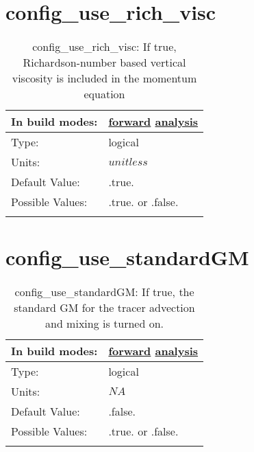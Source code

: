 \section[config\_use\_rich\_visc]{config\_use\_rich\_visc}
\label{sec:nm_sec_config_use_rich_visc}
\begin{center}
\begin{longtable}{| p{2.0in} || p{4.0in} |}
    \hline
    In build modes: & \hyperref[subsec:forward_nm_tab_vmix_rich]{forward} \hyperref[subsec:analysis_nm_tab_vmix_rich]{analysis} \\
    \hline
    Type: & logical \\
    \hline
    Units: & $unitless$ \\
    \hline
    Default Value: & .true. \\
    \hline
    Possible Values: & .true. or .false. \\
    \hline
    \caption{config\_use\_rich\_visc: If true, Richardson-number based vertical viscosity is included in the momentum equation}
\end{longtable}
\end{center}
\section[config\_use\_standardGM]{config\_use\_standardGM}
\label{sec:nm_sec_config_use_standardGM}
\begin{center}
\begin{longtable}{| p{2.0in} || p{4.0in} |}
    \hline
    In build modes: & \hyperref[subsec:forward_nm_tab_mesoscale_eddy_parameterization]{forward} \hyperref[subsec:analysis_nm_tab_mesoscale_eddy_parameterization]{analysis} \\
    \hline
    Type: & logical \\
    \hline
    Units: & $NA$ \\
    \hline
    Default Value: & .false. \\
    \hline
    Possible Values: & .true. or .false. \\
    \hline
    \caption{config\_use\_standardGM: If true, the standard GM for the tracer advection and mixing is turned on.}
\end{longtable}
\end{center}
